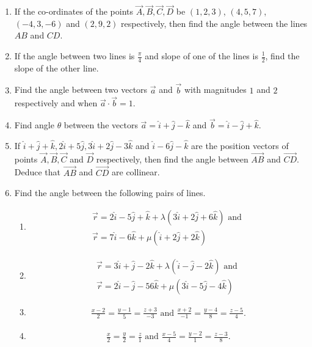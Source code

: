 \begin{enumerate}[label=\thesubsection.\arabic*, ref=\thesubsection.\theenumi]
\item If the co-ordinates of the points $\vec{A}, \vec{B}, \vec{C}, \vec{D}$ be $(1, 2, 3)$,  $(4, 5, 7)$,  $(-4, 3, -6)$ and $(2, 9, 2)$ respectively,  then find the angle between the lines $AB$ and $CD$.
\item If the angle between two lines is $\frac{\pi}{4}$ and slope of one of the lines is $\frac{1}{2}$, find the slope of the other line.
\item Find the angle between two vectors $\overrightarrow{a}$ and $\overrightarrow{b}$ with magnitudes $1$ and $2$ respectively and when $\overrightarrow{a}\cdot \overrightarrow{b} = 1$.
\item Find angle $\theta$ between the vectors $\overrightarrow{a} = \hat{i} +\hat{j} -\hat{k}$ and $\overrightarrow{b} = \hat{i} -\hat{j}+\hat{k}$.
\item If $\hat{i}+\hat{j}+\hat{k}, 2\hat{i}+5\hat{j}, 3\hat{i}+2\hat{j}-3\hat{k}$ and $\hat{i}-6\hat{j}-\hat{k}$ are the position vectors of points $\vec{A}, \vec{B}, \vec{C}$ and $\vec{D}$ respectively, then find the angle between $\overrightarrow{AB}$ and $\overrightarrow{CD}$. Deduce that $\overrightarrow{AB}$ and $\overrightarrow{CD}$ are collinear.
\item  Find the angle between the following pairs of lines.
\begin{enumerate}	
\item  
\begin{align}
\overrightarrow{r}=2\hat{i}-5\hat{j}+\hat{k}+\lambda(3\hat{i}+2\hat{j}+6\hat{k}) \text{ and }\\ \overrightarrow{r}=7\hat{i}-6\hat{k}+\mu(\hat{i}+2\hat{j}+2\hat{k}) 
\end{align} 
\item 
\begin{align}
\overrightarrow{r}=3\hat{i}+\hat{j}-2\hat{k}+\lambda(\hat{i}-\hat{j}-2\hat{k}) \text{ and }\\ \overrightarrow{r}=2\hat{i}-\hat{j}-56\hat{k}+\mu(3\hat{i}-5\hat{j}-4\hat{k})
\end{align}
\item 
\begin{align} \frac{x-2}{2}=\frac{y-1}{5}=\frac{z+3}{-3}\text{ and } \frac{x+2}{-1}=\frac{y-4}{8}=\frac{z-5}{4}.
\end{align}
\item
\begin{align} \frac{x}{2}=\frac{y}{2}=\frac{z}{1}\text{ and } \frac{x-5}{4}=\frac{y-2}{1}=\frac{z-3}{8}.
\end{align}

\end{enumerate}
\end{enumerate}
